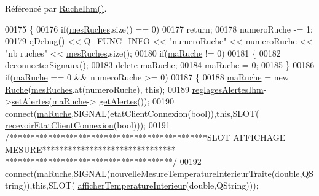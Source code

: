 Référencé par \hyperlink{class_ruche_ihm_a04c2544ba4e9cca6c38f553c32d63dee}{Ruche\+Ihm()}.


\begin{DoxyCode}
00175 \{
00176     \textcolor{keywordflow}{if}(\hyperlink{class_ruche_ihm_ab7741fa67b19cbb2da7eb12c58cf83c1}{mesRuches}.size() == 0)
00177         \textcolor{keywordflow}{return};
00178     numeroRuche -= 1;
00179     qDebug() << Q\_FUNC\_INFO << \textcolor{stringliteral}{"numeroRuche"} << numeroRuche << \textcolor{stringliteral}{"nb ruches"} << 
      \hyperlink{class_ruche_ihm_ab7741fa67b19cbb2da7eb12c58cf83c1}{mesRuches}.size();
00180     \textcolor{keywordflow}{if}(\hyperlink{class_ruche_ihm_a43a6b1fa31f4fba58d919daae3707b38}{maRuche} != 0)
00181     \{
00182         \hyperlink{class_ruche_ihm_a348a76106f3072dd31a382c6025b8113}{deconnecterSignaux}();
00183         \textcolor{keyword}{delete} \hyperlink{class_ruche_ihm_a43a6b1fa31f4fba58d919daae3707b38}{maRuche};
00184         \hyperlink{class_ruche_ihm_a43a6b1fa31f4fba58d919daae3707b38}{maRuche} = 0;      
00185     \}
00186     \textcolor{keywordflow}{if}(\hyperlink{class_ruche_ihm_a43a6b1fa31f4fba58d919daae3707b38}{maRuche} == 0 && numeroRuche >= 0)
00187     \{
00188         \hyperlink{class_ruche_ihm_a43a6b1fa31f4fba58d919daae3707b38}{maRuche} = \textcolor{keyword}{new} \hyperlink{class_ruche}{Ruche}(\hyperlink{class_ruche_ihm_ab7741fa67b19cbb2da7eb12c58cf83c1}{mesRuches}.at(numeroRuche), \textcolor{keyword}{this});
00189         \hyperlink{class_ruche_ihm_a04068fbec978c2443f3baf08d4945929}{reglagesAlertesIhm}->\hyperlink{class_reglages_alertes_ihm_aeb0331a6103f944cb15cdd62985ca231}{setAlertes}(\hyperlink{class_ruche_ihm_a43a6b1fa31f4fba58d919daae3707b38}{maRuche}->
      \hyperlink{class_ruche_a9edbc2e81ccb2cb76de43639bcb16ec1}{getAlertes}());
00190         connect(\hyperlink{class_ruche_ihm_a43a6b1fa31f4fba58d919daae3707b38}{maRuche},SIGNAL(etatClientConnexion(\textcolor{keywordtype}{bool})),\textcolor{keyword}{this},SLOT(
      \hyperlink{class_ruche_ihm_a3a3dae9de8c51344aa6e3463db9e6ad9}{recevoirEtatClientConnexion}(\textcolor{keywordtype}{bool})));
00191         \textcolor{comment}{/**********************************************SLOT AFFICHAGE MESURE*******************************
      ***************************************/}
00192         connect(\hyperlink{class_ruche_ihm_a43a6b1fa31f4fba58d919daae3707b38}{maRuche},SIGNAL(nouvelleMesureTemperatureInterieurTraite(\textcolor{keywordtype}{double},QString)),\textcolor{keyword}{this},SLOT(
      \hyperlink{class_ruche_ihm_a4b8483705f88b46e253ef73068cd8f2e}{afficherTemperatureInterieur}(\textcolor{keywordtype}{double},QString)));

\end{DoxyCode}
